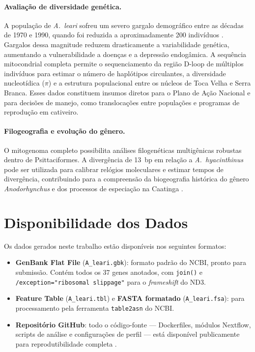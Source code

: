 \paragraph*{Avaliação de diversidade genética.}

A população de \textit{A.~leari} sofreu um severo gargalo demográfico entre as décadas de 1970 e 1990, quando foi reduzida a aproximadamente 200 indivíduos \cite{sick1979,icmbio2022}. Gargalos dessa magnitude reduzem drasticamente a variabilidade genética, aumentando a vulnerabilidade a doenças e a depressão endogâmica. A sequência mitocondrial completa permite o sequenciamento da região D-loop de múltiplos indivíduos para estimar o número de haplótipos circulantes, a diversidade nucleotídica ($\pi$) e a estrutura populacional entre os núcleos de Toca Velha e Serra Branca. Esses dados constituem insumos diretos para o Plano de Ação Nacional \cite{icmbio2022} e para decisões de manejo, como translocações entre populações e programas de reprodução em cativeiro.

\paragraph*{Filogeografia e evolução do gênero.}

O mitogenoma completo possibilita análises filogenéticas multigênicas robustas dentro de Psittaciformes. A divergência de 13~bp em relação a \textit{A.~hyacinthinus} pode ser utilizada para calibrar relógios moleculares e estimar tempos de divergência, contribuindo para a compreensão da biogeografia histórica do gênero \textit{Anodorhynchus} e dos processos de especiação na Caatinga \cite{tavares2006}.

\section{Disponibilidade dos Dados}
\label{sec:disponibilidade}

Os dados gerados neste trabalho estão disponíveis nos seguintes formatos:

\begin{itemize}
    \item \textbf{GenBank Flat File} (\texttt{A\_leari.gbk}): formato padrão do NCBI, pronto para submissão. Contém todos os 37 genes anotados, com \texttt{join()} e \texttt{/exception="ribosomal slippage"} para o \textit{frameshift} do ND3.

    \item \textbf{Feature Table} (\texttt{A\_leari.tbl}) e \textbf{FASTA formatado} (\texttt{A\_leari.fsa}): para processamento pela ferramenta \texttt{table2asn} do NCBI.

    \item \textbf{Repositório GitHub}: todo o código-fonte --- Dockerfiles, módulos Nextflow, scripts de análise e configurações de perfil --- está disponível publicamente para reprodutibilidade completa \cite{wilkinson2016}.
\end{itemize}

